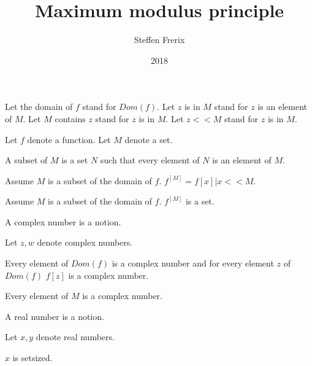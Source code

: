 \documentclass{document}
\title{Maximum modulus principle}
\author{Steffen Frerix}
\date{2018}
\begin{document}

  \maketitle

  \begin{forthel}

    Let the domain of $f$ stand for $Dom(f)$.
    Let $z$ is in $M$ stand for $z$ is an element of $M$.
    Let $M$ contains $z$ stand for $z$ is in $M$.
    Let $z << M$ stand for $z$ is in $M$.

    Let $f$ denote a function.
    Let $M$ denote a set.

    \begin{definition}
      A subset of $M$ is a set $N$ such that every element of $N$ is an element of $M$.
    \end{definition}

    \begin{definition}
      Assume $M$ is a subset of the domain of $f$. $f^[M] = { f[x] | x << M }$.
    \end{definition}

    \begin{axiom}
      Assume $M$ is a subset of the domain of $f$. $f^[M]$ is a set.
    \end{axiom}

    \begin{signature}
      A complex number is a notion.
    \end{signature}

    Let $z,w$ denote complex numbers.

    \begin{axiom}
      Every element of $Dom(f)$ is a complex number and for every element $z$ of $Dom(f)$ $f[z]$ is a complex number.
    \end{axiom}

    \begin{axiom}
      Every element of $M$ is a complex number.
    \end{axiom}

    \begin{signature}
      A real number is a notion.
    \end{signature}

    Let $x,y$ denote real numbers.

    \begin{axiom}
      $x$ is setsized.
    \end{axiom}


\end{forthel}
\end{document}

